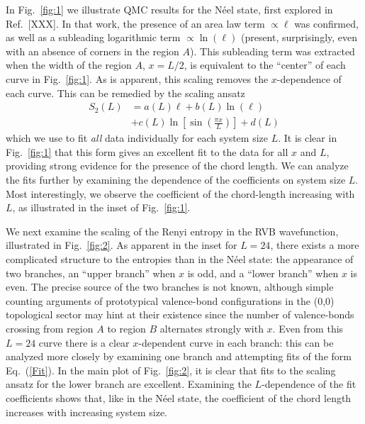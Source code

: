 \documentclass[prl,aps,twocolumn,floatfix,amsmath,amssymb,superscriptaddress,tightenlines]{revtex4}
\begin{document}
In Fig.~{\ref{fig:1}} we illustrate QMC results for the N\'eel state, first explored in Ref.~[XXX].  In that work, the presence of an area law term $\propto \ell$ was confirmed, as well as a subleading logarithmic term $\propto \ln(\ell)$ (present, surprisingly, even with an absence of corners in the region $A$).  This subleading term was extracted when the width of the region $A$, $x = L/2$, is equivalent to the ``center'' of each curve in Fig.~{\ref{fig:1}}.  As is apparent, this scaling removes the $x$-dependence of each curve.  {\color{red} This can be remedied} %
by the scaling ansatz
\begin{align}
S_2(L) &= a(L) \ell + b(L) \ln(\ell) \nonumber \\
&+ c(L) \ln \left[{ \sin\left({ \frac{\pi x}{L} }\right) }\right] + d(L) \label{Fit}
\end{align}
{\color{red} which we use to fit {\it all} data individually for each system size $L$. }
It is clear in Fig.~{\ref{fig:1}} that this form gives an excellent fit to the data for all $x$ and $L$, providing strong evidence for the presence of the chord length.  We can analyze the fits further by examining the dependence of the coefficients on system size $L$.  Most interestingly, we observe the coefficient of the chord-length increasing with $L$, as illustrated in the inset of Fig.~{\ref{fig:1}}.

We next examine the scaling of the Renyi entropy in the RVB wavefunction, illustrated in Fig.~{\ref{fig:2}}.  As apparent in the inset for $L=24$, there exists a more complicated structure to the entropies than in the N\'eel state: the appearance of two branches, an ``upper branch'' when $x$ is odd, and a ``lower branch'' when $x$ is even.  The precise source of the two branches is not known, although simple counting arguments of prototypical valence-bond configurations in the (0,0) topological sector may hint at their existence since the number of valence-bonds crossing from region $A$ to region $B$ alternates strongly with $x$.  Even from this $L=24$ curve there is a clear $x$-dependent curve in each branch: this can be analyzed more closely by examining one branch and attempting fits of the form Eq.~(\ref{Fit}).  In the main plot of Fig.~{\ref{fig:2}}, it is clear that fits to the scaling ansatz for the lower branch are excellent.  Examining the $L$-dependence of the fit coefficients shows that, like in the N\'eel state, the coefficient of the chord length increases with increasing system size.
\end{document}
